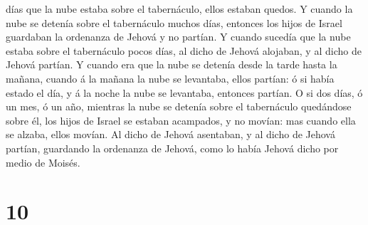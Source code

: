 días que la nube estaba sobre el tabernáculo, ellos estaban quedos.
 Y cuando la nube se detenía sobre el tabernáculo muchos
días, entonces los hijos de Israel guardaban la ordenanza de Jehová y no
partían.  Y cuando sucedía que la nube estaba sobre el
tabernáculo pocos días, al dicho de Jehová alojaban, y al dicho de
Jehová partían.  Y cuando era que la nube se detenía
desde la tarde hasta la mañana, cuando á la mañana la nube se levantaba,
ellos partían: ó si había estado el día, y á la noche la nube se
levantaba, entonces partían.  O si dos días, ó un mes, ó
un año, mientras la nube se detenía sobre el tabernáculo quedándose
sobre él, los hijos de Israel se estaban acampados, y no movían: mas
cuando ella se alzaba, ellos movían.  Al dicho de Jehová
asentaban, y al dicho de Jehová partían, guardando la ordenanza de
Jehová, como lo había Jehová dicho por medio de Moisés.

\hypertarget{section-9}{%
\section{10}\label{section-9}}

